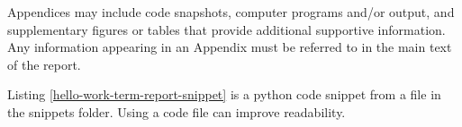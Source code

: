 

Appendices may include code snapshots, computer programs and/or output, and supplementary figures or tables that provide additional supportive information. Any information appearing in an Appendix must be referred to in the main text of the report.


Listing \ref{hello-work-term-report-snippet} is a python code snippet from a file in the snippets folder. Using a code file can improve readability. 

\vspace{0.25cm}


